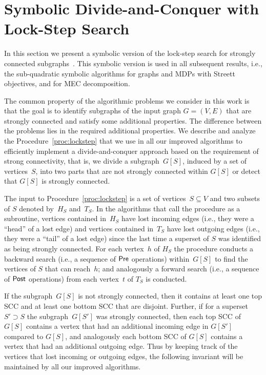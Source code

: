 \vspace{-3mm}
\section{Symbolic Divide-and-Conquer with Lock-Step Search}\label{sec:lss}

\vspace{-1mm}
In this section we present a symbolic version of the lock-step
search for strongly connected subgraphs~\cite{HenzingerT96}. 
This symbolic version is used in all subsequent results, i.e., the
sub-quadratic symbolic algorithms for graphs and MDPs with Streett objectives,
and for MEC decomposition.

\vspace{-1mm}
\smallskip{}
The common property of the algorithmic problems we consider in this work is
that the goal is to identify subgraphs of the input graph $G = (V, E)$
that are strongly connected and satisfy some additional properties. The difference between
the problems lies in the required additional properties. We 
describe and analyze the Procedure~\ref{proc:lockstep} that we use in all our improved 
algorithms to efficiently implement a divide-and-conquer approach based on the
requirement of strong connectivity, that is, we divide a subgraph~$G[S]$,
induced by a set of vertices~$S$, into 
two parts that are not strongly connected within $G[S]$ or detect that $G[S]$ is 
strongly connected. 

\vspace{-1mm}
\smallskip{}
The input to Procedure~\ref{proc:lockstep} is a set of vertices~$S \subseteq V$ 
and two subsets of $S$ denoted by~$H_S$ and~$T_S$.
In the algorithms that call the procedure as a subroutine, vertices
contained in~$H_S$ have lost incoming edges (i.e., they were a  ``head'' of
a lost edge) and vertices contained in~$T_S$ have lost outgoing edges
(i.e., they were a  ``tail'' of a lost edge) since the last time a superset
of $S$ was identified as being strongly connected.
For each vertex~$h$ of $H_S$ the procedure
conducts a backward search (i.e., a sequence of $\mathsf{Pre}$ operations) within~$G[S]$ to 
find the vertices of $S$ that can 
reach~$h$; and analogously a forward search (i.e., a sequence of $\mathsf{Post}$ operations)
from each vertex~$t$ of $T_S$ is conducted.

\vspace{-1mm}
\smallskip{}
If the subgraph~$G[S]$ is not strongly connected, then it contains at least 
one top SCC and at least one bottom SCC that are disjoint. Further, if for 
a superset $S' \supset S$ the subgraph~$G[S']$ was strongly connected, then 
each top SCC of $G[S]$ contains a vertex that had an additional 
incoming edge in $G[S']$ compared to $G[S]$, and analogously each bottom SCC of 
$G[S]$ contains a vertex that had an additional outgoing edge. Thus by keeping
track of the vertices that lost incoming or outgoing edges, the following invariant
will be maintained by all our improved algorithms.

